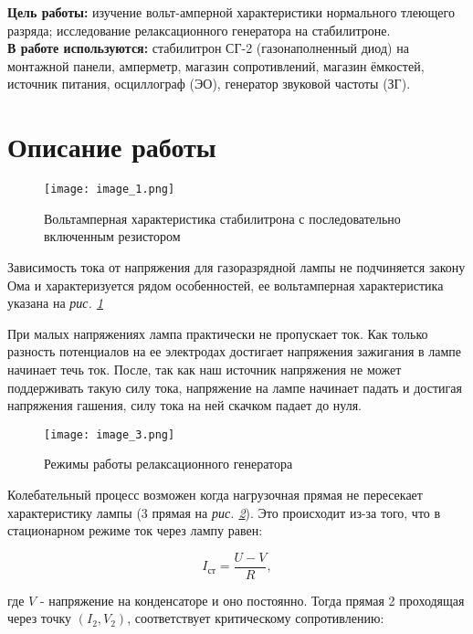 






\newpage

\noindent \textbf{Цель работы:} 
\noindent изучение вольт-амперной характеристики нормального тлеющего разряда; исследование релаксационного генератора на стабилитроне.\\
\noindent \textbf{В работе используются:} 
\noindent стабилитрон СГ-2 (газонаполненный диод) на монтажной панели, амперметр, магазин сопротивлений, магазин ёмкостей, источник питания, осциллограф (ЭО), генератор звуковой частоты (ЗГ).
\section*{Описание работы}



\begin{figure}[h!]
	\centering
	\texttt{[image: image\_1.png]}
	\caption{Вольтамперная характеристика стабилитрона с последовательно включенным резистором\label{fig:image_1}}
	
\end{figure}

Зависимость тока от напряжения для газоразрядной лампы не подчиняется закону Ома и характеризуется рядом особенностей, ее вольтамперная характеристика указана на \textit{рис. \ref{fig:image_1}}

При малых напряжениях лампа практически не пропускает ток. Как только разность потенциалов на ее электродах достигает напряжения зажигания в лампе начинает течь ток. После, так как наш источник напряжения не может поддерживать такую силу тока, напряжение на лампе начинает падать и достигая напряжения гашения, силу тока на ней скачком падает до нуля.

\begin{figure}[h!]
	\centering
	\texttt{[image: image\_3.png]}
	\caption{Режимы работы релаксационного генератора}
	\label{fig:image_2}
\end{figure}

Колебательный процесс возможен когда нагрузочная прямая не пересекает характеристику лампы (3 прямая на \textit{рис. \ref{fig:image_2}}). Это происходит из-за того, что в стационарном режиме ток через лампу равен:

\[I_{ст} = \frac{U - V}{R},\]

где $V$ - напряжение на конденсаторе и оно постоянно. Тогда прямая 2 проходящая через точку $(I_2, V_2)$, соответствует критическому сопротивлению:

